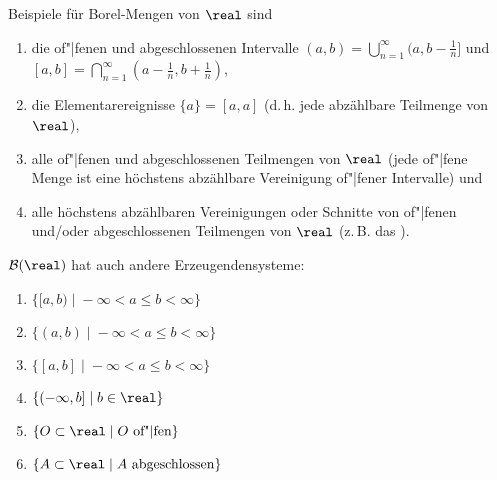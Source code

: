 \begin{Bsp}
    Beispiele für Borel-Mengen von $\real$ sind
    \begin{enumerate}
        \item
        die of"|fenen und abgeschlossenen Intervalle
        $(a, b) = \bigcup_{n=1}^\infty (a, b - \frac{1}{n}]$ und
        $[a, b] = \bigcap_{n=1}^\infty (a - \frac{1}{n}, b + \frac{1}{n})$,
        
        \item
        die Elementarereignisse $\{a\} = [a, a]$ (d.\,h. jede abzählbare Teilmenge von $\real$),
        
        \item
        alle of"|fenen und abgeschlossenen Teilmengen von $\real$
        (jede of"|fene Menge ist eine höchstens abzählbare Vereinigung of"|fener Intervalle) und
        
        \item
        alle höchstens abzählbaren Vereinigungen oder Schnitte von of"|fenen und/oder
        abgeschlossenen Teilmengen von $\real$
        (z.\,B. das ).
    \end{enumerate}
\end{Bsp}

\linie
\pagebreak

\begin{Bem}
    $\B(\real)$ hat auch andere Erzeugendensysteme:
    \begin{enumerate}
        \item
        $\{[a, b) \;|\; -\infty < a \le b < \infty\}$
        
        \item
        $\{(a, b) \;|\; -\infty < a \le b < \infty\}$
        
        \item
        $\{[a, b] \;|\; -\infty < a \le b < \infty\}$
        
        \item
        $\{(-\infty, b] \;|\; b \in \real\}$
        
        \item
        $\{O \subset \real \;|\; O \text{ of"|fen}\}$
        
        \item
        $\{A \subset \real \;|\; A \text{ abgeschlossen}\}$
    \end{enumerate}
\end{Bem}

\linie

